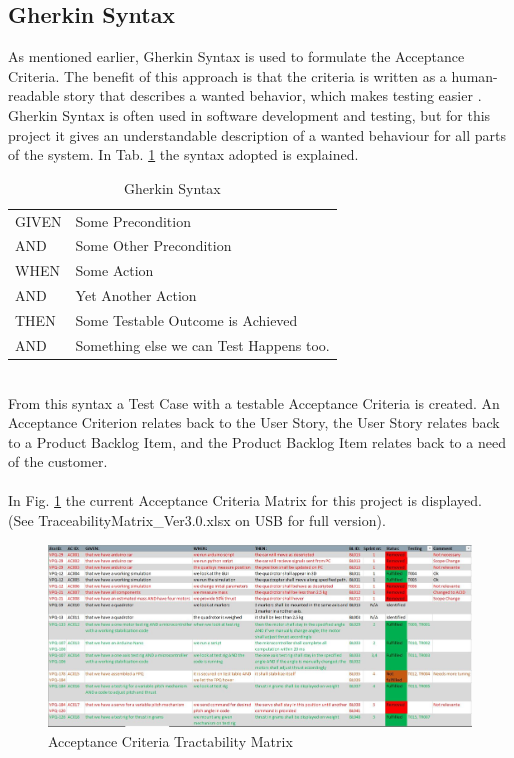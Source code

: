 \subsection{Gherkin Syntax}
As mentioned earlier, Gherkin Syntax is used to formulate the Acceptance Criteria. The benefit of this approach is that the criteria is written as a human-readable story that describes a wanted behavior, which makes testing easier \cite{ref7}. Gherkin Syntax is often used in software development and testing, but for this project it gives an understandable description of a wanted behaviour for all parts of the system. In Tab. \ref{tab:gherkin} the syntax adopted is explained. 
\begin {table}[h]
    \begin{center}
    \caption {Gherkin Syntax} 
    \label{tab:gherkin} 
    \begin{tabular}{|l|l|}\hline 
    GIVEN   &   Some Precondition \\ \rowcolor{gainsboro}
    AND    &   Some Other Precondition        \\
    WHEN    &   Some Action        \\ \rowcolor{gainsboro}
    AND    &   Yet Another Action        \\
    THEN    &   Some Testable Outcome is Achieved       \\ \rowcolor{gainsboro}
    AND    &   Something else we can Test Happens too.   \\
    \hline
    \end{tabular}
    \end{center}
\end{table}
\\
From this syntax a Test Case with a testable Acceptance Criteria is created. An Acceptance Criterion relates back to the User Story, the User Story relates back to a Product Backlog Item, and the Product Backlog Item relates back to a need of the customer.\\
\\
In Fig. \ref{fig:ACmatrix} the current Acceptance Criteria Matrix for this project is displayed. (See TraceabilityMatrix_Ver3.0.xlsx on USB for full version).

\begin{figure}[h]
    \centering
        \includegraphics[width=1\textwidth]{VAPIQ-PICTURES/ACmatrix}
        \caption{Acceptance Criteria Tractability Matrix}
        \label{fig:ACmatrix}
\end{figure}


